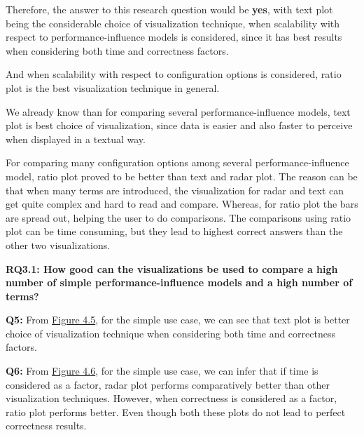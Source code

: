 Therefore, the answer to this research question would be \textbf{yes}, with text plot being the considerable choice of visualization technique, when scalability with respect to performance-influence models is considered, since it has best results when considering both time and correctness factors.

And when scalability with respect to configuration options is considered, ratio plot is the best visualization technique in general.

We already know than for comparing several performance-influence models, text plot is best choice of visualization, since data is easier and also faster to perceive when displayed in a textual way.

For comparing many configuration options among several performance-influence model, ratio plot proved to be better than text and radar plot. The reason can be that when many terms are introduced, the visualization for radar and text can get quite complex and hard to read and compare. Whereas, for ratio plot the bars are spread out, helping the user to do comparisons. The comparisons using ratio plot can be time consuming, but they lead to highest correct answers than the other two visualizations.

\begin{mdframed} 
\textbf{RQ3.1: How good can the visualizations be used to compare a high number of simple performance-influence models and a high number of terms?}
\end{mdframed}

\textbf{Q5:} From \hyperref[figure:paretoManyQ5]{Figure 4.5}, for the simple use case, we can see that text plot is better choice of visualization technique when considering both time and correctness factors.

\textbf{Q6:} From \hyperref[figure:paretoManyQ6]{Figure 4.6}, for the simple use case, we can infer that if time is considered as a factor, radar plot performs comparatively better than other visualization techniques. However, when correctness is considered as a factor, ratio plot performs better. Even though both these plots do not lead to perfect correctness results.

